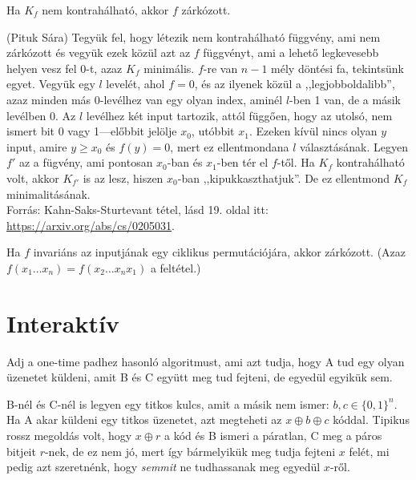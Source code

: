 \begin{Exercise}[counter={sorszam}, difficulty=0]
	Ha $K_f$ nem kontrah\'alhat\'o, akkor $f$ zárkózott.
\end{Exercise}
\begin{Answer}
	(Pituk S\'ara) Tegy\"uk fel, hogy l\'etezik nem kontrah\'alhat\'o f\"uggv\'eny, ami nem z\'ark\'ozott \'es vegy\"uk ezek k\"oz\"ul azt az $f$ f\"uggv\'enyt, ami a lehet\H o legkevesebb helyen vesz fel 0-t, azaz $K_f$ minim\'alis.	
	$f$-re van $n-1$ m\'ely d\"ont\'esi fa, tekints\"unk egyet.
	Vegy\"uk egy $l$ level\'et, ahol $f=0$, \'es az ilyenek k\"oz\"ul a ,,legjobboldalibb'', azaz minden m\'as 0-lev\'elhez van egy olyan index, amin\'el $l$-ben 1 van, de a m\'asik lev\'elben 0.
	Az $l$ lev\'elhez k\'et input tartozik, att\'ol f\"ugg\H oen, hogy az utols\'o, nem ismert bit 0 vagy 1---el\H obbit jel\"olje $x_0$, ut\'obbit $x_1$.
	Ezeken k\'iv\"ul nincs olyan $y$ input, amire $y\ge x_0$ \'es $f(y)=0$, mert ez ellentmondana $l$ v\'alaszt\'as\'anak.
	Legyen $f'$ az a f\"ugv\'eny, ami pontosan $x_0$-ban \'es $x_1$-ben t\'er el $f$-t\H ol.
	Ha $K_f$ kontrah\'alhat\'o volt, akkor $K_{f'}$ is az lesz, hiszen $x_0$-ban ,,kipukkaszthatjuk''.
	De ez ellentmond $K_f$ minimalit\'as\'anak.\\
	Forr\'as: Kahn-Saks-Sturtevant t\'etel, l\'asd 19. oldal itt: \url{https://arxiv.org/abs/cs/0205031}.
\end{Answer}

\begin{Exercise}[counter={sorszam}, difficulty=1]
	Ha $f$ invari\'ans az inputj\'anak egy ciklikus permut\'aci\'oj\'ara, akkor z\'ark\'ozott. (Azaz $f(x_1\ldots x_n)=f(x_2\ldots x_nx_1)$ a felt\'etel.)
\end{Exercise}



\chapter{Interakt\'iv}

\begin{Exercise}[counter={sorszam}, difficulty=0]
	Adj a one-time padhez hasonl\'o algoritmust, ami azt tudja, hogy A tud egy olyan \"uzenetet k\"uldeni, amit B \'es C egy\"utt meg tud fejteni, de egyed\"ul egyik\"uk sem.
\end{Exercise}
\begin{Answer}
	B-n\'el \'es C-n\'el is legyen egy titkos kulcs, amit a m\'asik nem ismer: $b,c\in\{0,1\}^n$. Ha A akar k\"uldeni egy titkos \"uzenetet, azt megteheti az $x\oplus b\oplus c$ k\'oddal. Tipikus rossz megold\'as volt, hogy $x\oplus r$ a k\'od \'es B ismeri a p\'aratlan, C meg a p\'aros bitjeit $r$-nek, de ez nem j\'o, mert \'igy b\'armelyik\"uk meg tudja fejteni $x$ fel\'et, mi pedig azt szeretn\'enk, hogy \emph{semmit} ne tudhassanak meg egyed\"ul $x$-r\H ol.
\end{Answer}

